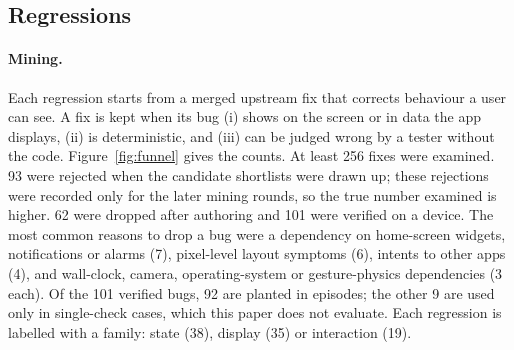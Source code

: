 \documentclass[sigconf]{acmart}
\begin{document}
\subsection{Regressions}
\label{sec:regressions}

\paragraph{Mining.}
Each regression starts from a merged upstream fix that corrects behaviour a user can see. A fix is
kept when its bug (i) shows on the screen or in data the app displays, (ii) is deterministic, and
(iii) can be judged wrong by a tester without the code. Figure~\ref{fig:funnel} gives the counts. At
least 256 fixes were examined. 93 were rejected when the candidate shortlists were drawn up; these
rejections were recorded only for the later mining rounds, so the true number examined is higher. 62
were dropped after authoring and 101 were verified on a device. The most common reasons to drop a bug
were a dependency on home-screen widgets, notifications or alarms (7), pixel-level layout symptoms
(6), intents to other apps (4), and wall-clock, camera, operating-system or gesture-physics
dependencies (3 each). Of the 101 verified bugs, 92 are planted in episodes; the other 9 are used only
in single-check cases, which this paper does not evaluate. Each regression is labelled with a family:
state (38), display (35) or interaction (19).
\end{document}
